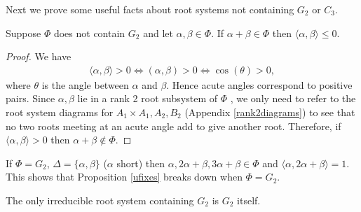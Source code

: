 Next we prove some useful facts about root systems not containing $G_2$ or $C_3$.

\begin{proposition} \label{ufixes} Suppose $\Phi$ does not contain $G_2$ and let $\alpha,\beta\in\Phi$. If $\alpha + \beta \in \Phi$ then $\langle \alpha, \beta \rangle \leq 0$.
\end{proposition}
\begin{proof}We have
\begin{align*}
\langle \alpha, \beta \rangle > 0 \Leftrightarrow (\alpha, \beta) >0 \Leftrightarrow \cos(\theta) > 0,
\end{align*}
where $\theta$ is the angle between $\alpha$ and $\beta$. Hence acute angles correspond to positive pairs. Since $\alpha,\beta$ lie in a rank 2 root subsystem of $\Phi$ \cite[A.4]{humphreys1975linear}, we only need to refer to the root system diagrams for $A_1\times A_1, A_2, B_2$ (Appendix \ref{rank2diagrams}) to see that no two roots meeting at an acute angle add to give another root. Therefore, if $\langle \alpha, \beta \rangle > 0$ then $\alpha + \beta \notin \Phi$.
\end{proof}

\begin{remark}\label{g2counter}
If $\Phi = G_2$, $\Delta = \{\alpha, \beta\}$ ($\alpha$ short) then $\alpha, 2\alpha + \beta, 3\alpha + \beta \in \Phi$ and $\langle \alpha, 2\alpha + \beta \rangle = 1$. This shows that Proposition \ref{ufixes} breaks down when $\Phi = G_2$.
\end{remark}
\begin{remark}\label{g2rem}
	The only irreducible root system containing $G_2$ is $G_2$ itself.
\end{remark}

